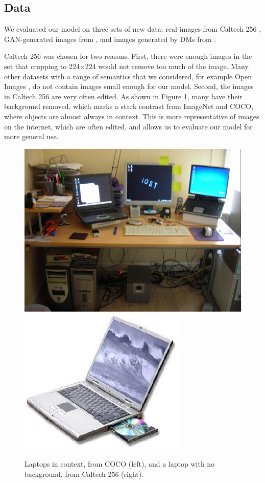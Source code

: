 \documentclass{article} %
\begin{document}
\subsection{Data}

We evaluated our model on three sets of new data: real images from Caltech 256 \citep{griffinholubperona2022}, GAN-generated images from \citet{chuangchuangtanGANGenDetection}, and images generated by DMs from \citet{stable-diffusion-100k-custom-prompts-and-images}.

Caltech 256 was chosen for two reasons. First, there were enough images in the set that cropping to 224×224 would not remove too much of the image. Many other datasets with a range of semantics that we considered, for example Open Images \citep{Kuznetsova_2020}, do not contain images small enough for our model. Second, the images in Caltech 256 are very often edited. As shown in Figure \ref{fig:coco_vs_caltech}, many have their background removed, which marks a stark contrast from ImageNet and COCO, where objects are almost always in context. This is more representative of images on the internet, which are often edited, and allows us to evaluate our model for more general use.

\begin{figure}[h]
    \begin{center}
        \includegraphics[scale=0.3]{figs/coco_laptop.jpg}
        \includegraphics[scale=0.45]{figs/caltech_laptop.jpg}
    \end{center}
    \caption{Laptops in context, from COCO (left), and a laptop with no background, from Caltech 256 (right).}
    \label{fig:coco_vs_caltech}
\end{figure}
\end{document}
